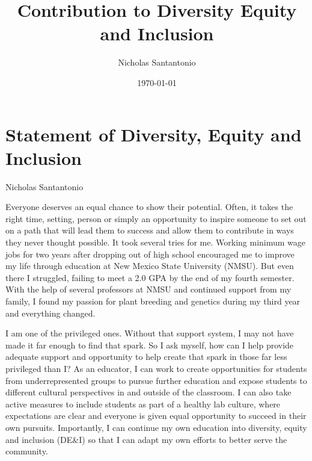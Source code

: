 \documentclass[11pt]{article}
\title{Contribution to Diversity Equity and Inclusion}
\author{Nicholas Santantonio}
\date{\today}
\begin{document}
\section*{\centering Statement of Diversity, Equity and Inclusion}
\begin{center} Nicholas Santantonio \end{center}





Everyone deserves an equal chance to show their potential. Often, it takes the right time, setting, person or simply an opportunity to inspire someone to set out on a path that will lead them to success and allow them to contribute in ways they never thought possible. It took several tries for me. Working minimum wage jobs for two years after dropping out of high school encouraged me to improve my life through education at New Mexico State University (NMSU). But even there I struggled, failing to meet a 2.0 GPA by the end of my fourth semester. With the help of several professors at NMSU and continued support from my family, I found my passion for plant breeding and genetics during my third year and everything changed.

I am one of the privileged ones. Without that support system, I may not have made it far enough to find that spark. So I ask myself, how can I help provide adequate support and opportunity to help create that spark in those far less privileged than I? As an educator, I can work to create opportunities for students from underrepresented groups to pursue further education and expose students to different cultural perspectives in and outside of the classroom. I can also take active measures to include students as part of a healthy lab culture, where expectations are clear and everyone is given equal opportunity to succeed in their own pursuits. Importantly, I can continue my own education into diversity, equity and inclusion (DE\&I) so that I can adapt my own efforts to better serve the community. 
\end{document}
